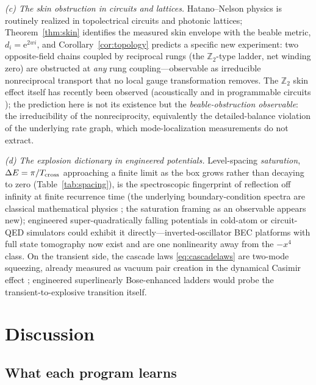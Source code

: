 \documentclass[11pt]{article}
\theoremstyle{definition}
\theoremstyle{remark}
\newcommand{\ee}{\mathrm{e}}
\begin{document}
\emph{(c) The skin obstruction in circuits and lattices.}
Hatano--Nelson physics is routinely realized in topolectrical
circuits and photonic lattices; Theorem~\ref{thm:skin} identifies
the measured skin envelope with the beable metric,
$d_i=\ee^{2wi}$, and Corollary~\ref{cor:topology} predicts a
specific new experiment: two opposite-field chains coupled by
reciprocal rungs (the $\mathbb Z_2$-type ladder, net winding zero)
are obstructed at \emph{any} rung coupling---observable as
irreducible nonreciprocal transport that no local gauge
transformation removes. The $\mathbb Z_2$ skin effect itself has
recently been observed (acoustically and in programmable circuits
\cite{Z2experiments}); the prediction here is not its existence but
the \emph{beable-obstruction observable}: the irreducibility of the
nonreciprocity, equivalently the detailed-balance violation of the
underlying rate graph, which mode-localization measurements do not
extract.

\emph{(d) The explosion dictionary in engineered potentials.}
Level-spacing \emph{saturation}, $\Delta E=\pi/T_{\rm cross}$
approaching a finite limit as the box grows rather than decaying to
zero (Table~\ref{tab:spacing}), is the
spectroscopic fingerprint of reflection off infinity at finite
recurrence time (the underlying boundary-condition spectra are
classical mathematical physics \cite{BottomlessPotentials}; the
saturation framing as an observable appears new); engineered
super-quadratically falling potentials in cold-atom or circuit-QED
simulators could exhibit it directly---inverted-oscillator BEC
platforms with full state tomography now exist
\cite{InvertedHO2026} and are one nonlinearity away from the
$-x^{4}$ class. On the transient side, the cascade laws
\eqref{eq:cascadelaws} are two-mode squeezing, already measured as
vacuum pair creation in the dynamical Casimir effect
\cite{WilsonDCE}; engineered superlinearly Bose-enhanced ladders
would probe the transient-to-explosive transition itself.

\section{Discussion}
\label{sec:discussion}

\subsection{What each program learns}
\end{document}
